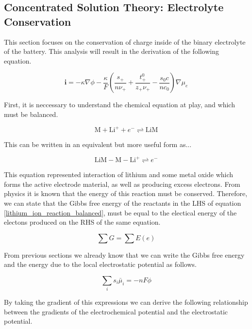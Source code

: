 \documentclass[lettersize,journal]{IEEEtran}
\begin{document}
\subsection{Concentrated Solution Theory: Electrolyte Conservation}

This section focuses on the conservation of charge inside of the binary electrolyte of the battery. This analysis will result in the derivation of the following equation.

\begin{equation}
\mathbf{i}=-\kappa \nabla \phi-\frac{\kappa}{F}\left(\frac{s_{+}}{n \nu_{+}}+\frac{t_{+}^{0}}{z_{+} \nu_{+}}-\frac{s_{0} c}{n c_{0}}\right) \nabla \mu_{e}
\end{equation}


First, it is neccessary to understand the chemical equation at play, and which must be balanced.

\begin{equation}
\mathrm{M}+\mathrm{Li}^{+}+e^{-} \rightleftharpoons \mathrm{LiM}
\end{equation}

This can be written in an equivalent but more useful form as...

\begin{equation}\label{lithium_ion_reaction_balanced}
\mathrm{LiM}-\mathrm{M}-\mathrm{Li}^{+} \rightleftharpoons e^{-}
\end{equation}

This equation represented interaction of lithium and some metal oxide which forms the active electrode material, as well as producing excess electrons. From physics it is known that the energy of this reaction must be conserved. Therefore, we can state that the Gibbs free energy of the reactants in the LHS of equation \ref{lithium_ion_reaction_balanced}, must be equal to the electical energy of the electons produced on the RHS of the same equation.


\begin{equation}
  \sum{G} = \sum{E(e)}
\end{equation}

From previous sections we already know that we can write the Gibbs free energy and the energy due to the local electrostatic potential as follows.

\begin{equation}
\sum_{i} s_{i} \bar{\mu}_{i}=-n F \phi
\end{equation}

By taking the gradient of this expressions we can derive the following relationship between the gradients of the electrochemical potential and the electrostatic potential.
\end{document}
